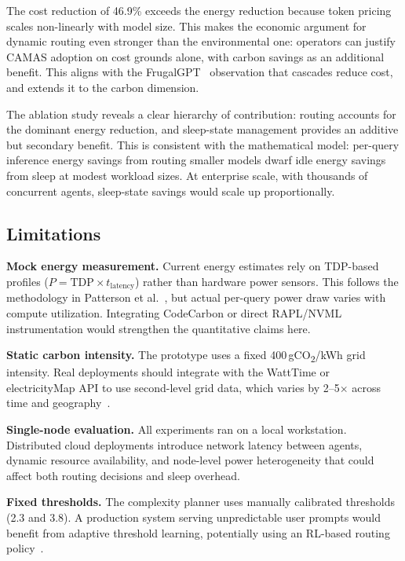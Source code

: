 \documentclass[journal]{IEEEtran}
\begin{document}
The cost reduction of 46.9\% exceeds the energy reduction because token pricing
scales non-linearly with model size. This makes the economic argument for
dynamic routing even stronger than the environmental one: operators can justify
CAMAS adoption on cost grounds alone, with carbon savings as an additional
benefit. This aligns with the FrugalGPT~\cite{chen2023frugalgpt} observation
that cascades reduce cost, and extends it to the carbon dimension.

The ablation study reveals a clear hierarchy of contribution: routing accounts
for the dominant energy reduction, and sleep-state management provides an
additive but secondary benefit. This is consistent with the mathematical model:
per-query inference energy savings from routing smaller models dwarf idle energy
savings from sleep at modest workload sizes. At enterprise scale, with thousands of concurrent agents, sleep-state
savings would scale up proportionally.

\subsection{Limitations}

\textbf{Mock energy measurement.} Current energy estimates rely on TDP-based
profiles ($P = \text{TDP} \times t_{\text{latency}}$) rather than hardware
power sensors. This follows the methodology in
Patterson et al.~\cite{patterson2021carbon}, but actual per-query power draw
varies with compute utilization. Integrating CodeCarbon or direct RAPL/NVML
instrumentation would strengthen the quantitative claims here.

\textbf{Static carbon intensity.} The prototype uses a fixed
400\,gCO\textsubscript{2}/kWh grid intensity. Real deployments should integrate
with the WattTime or electricityMap API to use second-level grid data, which
varies by 2--5$\times$ across time and geography~\cite{radovanovic2022carbon}.

\textbf{Single-node evaluation.} All experiments ran on a local workstation.
Distributed cloud deployments introduce network latency between agents, dynamic
resource availability, and node-level power heterogeneity that could affect
both routing decisions and sleep overhead.

\textbf{Fixed thresholds.} The complexity planner uses manually calibrated
thresholds (2.3 and 3.8). A production system serving unpredictable user
prompts would benefit from adaptive threshold learning, potentially using an
RL-based routing policy~\cite{shao2024routellm}.
\end{document}
